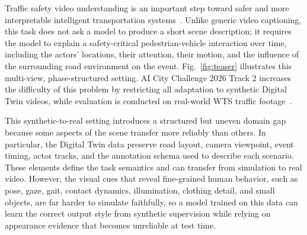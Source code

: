 \documentclass[runningheads]{llncs}
\begin{document}
Traffic safety video understanding is an important step toward safer and more interpretable intelligent transportation systems~\cite{kong2024wts}. Unlike generic video captioning, this task does not ask a model to produce a short scene description; it requires the model to explain a safety-critical pedestrian-vehicle interaction over time, including the actors' locations, their attention, their motion, and the influence of the surrounding road environment on the event. Fig.~\ref{fig:teaser} illustrates this multi-view, phase-structured setting. AI City Challenge 2026 Track 2 increases the difficulty of this problem by restricting all adaptation to synthetic Digital Twin videos, while evaluation is conducted on real-world WTS traffic footage~\cite{aicitytrack2}.

This synthetic-to-real setting introduces a structured but uneven domain gap because some aspects of the scene transfer more reliably than others. In particular, the Digital Twin data preserve road layout, camera viewpoint, event timing, actor tracks, and the annotation schema used to describe each scenario. These elements define the task semantics and can transfer from simulation to real video. However, the visual cues that reveal fine-grained human behavior, such as pose, gaze, gait, contact dynamics, illumination, clothing detail, and small objects, are far harder to simulate faithfully, so a model trained on this data can learn the correct output style from synthetic supervision while relying on appearance evidence that becomes unreliable at test time.
\end{document}
